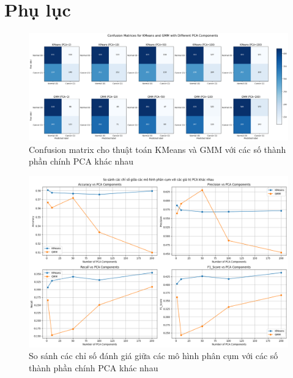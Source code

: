 \section{Phụ lục}

\begin{figure}[H]
    \centering
    \includegraphics[width=1\linewidth]{img/confusion_matrix.png}
    \caption{Confusion matrix cho thuật toán KMeans và GMM với các số thành phần chính PCA khác nhau}
\end{figure}

\begin{figure}[H]
    \centering
    \includegraphics[width=1\linewidth]{img/metrics_with_pca.png}
    \caption{So sánh các chỉ số đánh giá giữa các mô hình phân cụm với các số thành phần chính PCA khác nhau}
\end{figure}

